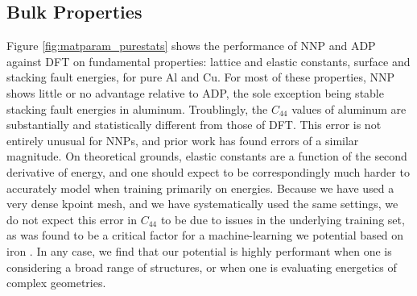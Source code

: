 \documentclass{article}
\begin{document}
\subsection{Bulk Properties} \label{sct:bulk_properties}

Figure \ref{fig:matparam_purestats} shows the performance of NNP and ADP against DFT on fundamental properties: lattice and elastic constants, surface and stacking fault energies, for pure Al and Cu.
For most of these properties, NNP shows little or no advantage relative to ADP, the sole exception being stable stacking fault energies in aluminum.
Troublingly, the $C_{44}$ values of aluminum are substantially and statistically different from those of DFT.
This error is not entirely unusual for NNPs, and prior work has found errors of a similar magnitude\cite{Zuo2020APotentials}.
On theoretical grounds, elastic constants are a function of the second derivative of energy, and one should expect to be correspondingly much harder to accurately model when training primarily on energies.
Because we have used a very dense kpoint mesh, and we have systematically used the same settings, we do not expect this error in $C_{44}$ to be due to issues in the underlying training set, as was found to be a critical factor for a machine-learning we potential based on iron \cite{Dragoni2018AchievingIron}.  
In any case, we find that our potential is highly performant when one is considering a broad range of structures, or when one is evaluating energetics of complex geometries. 
\end{document}
